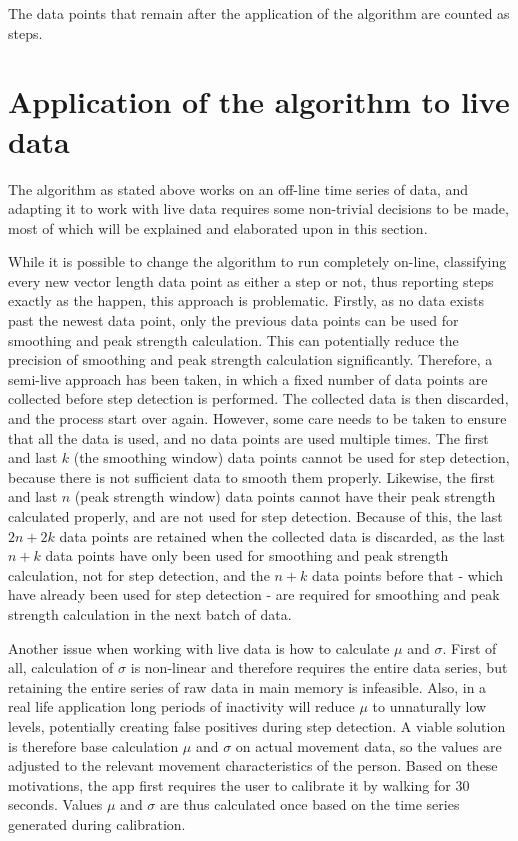 The data points that remain after the application of the algorithm are counted as steps.

\section{Application of the algorithm to live data}
\label{sec:liveAlgoApplication}
The algorithm as stated above works on an off-line time series of data, and adapting it to work with live data requires some non-trivial decisions to be made, most of which will be explained and elaborated upon in this section. 

While it is possible to change the algorithm to run completely on-line, classifying every new vector length data point as either a step or not, thus reporting steps exactly as the happen, this approach is problematic. Firstly, as no data exists past the newest data point, only the previous data points can be used for smoothing and peak strength calculation. This can potentially reduce the precision of smoothing and peak strength calculation significantly. Therefore, a semi-live approach has been taken, in which a fixed number of data points are collected before step detection is performed. The collected data is then discarded, and the process start over again. However, some care needs to be taken to ensure that all the data is used, and no data points are used multiple times. The first and last $k$ (the smoothing window) data points cannot be used for step detection, because there is not sufficient data to smooth them properly. Likewise, the first and last $n$ (peak strength window) data points cannot have their peak strength calculated properly, and are not used for step detection. Because of this, the last $2n + 2k$ data points are retained when the collected data is discarded, as the last $n+k$ data points have only been used for smoothing and peak strength calculation, not for step detection, and the $n+k$ data points before that - which have already been used for step detection - are required for smoothing and peak strength calculation in the next batch of data.

Another issue when working with live data is how to calculate $\mu$ and $\sigma$. First of all, calculation of $\sigma$ is non-linear and therefore requires the entire data series, but retaining the entire series of raw data in main memory is infeasible. Also, in a real life application long periods of inactivity will reduce $\mu$ to unnaturally low levels, potentially creating false positives during step detection. A viable solution is therefore base calculation $\mu$ and $\sigma$ on actual movement data, so the values are adjusted to the relevant movement characteristics of the person. Based on these motivations, the app first requires the user to calibrate it by walking for 30 seconds. Values $\mu$ and $\sigma$ are thus calculated once based on the time series generated during calibration. 

